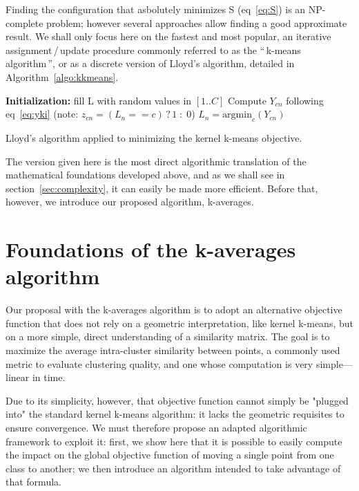 \documentclass[a4paper,twoside]{article}
\newcommand{\cad}{---} %
\newcommand{\gl}[1]{``\,#1\,''} %
\begin{document}
Finding the configuration that asbolutely minimizes S (eq~\ref{eq:S}) is an NP-complete problem; however several approaches allow finding a good approximate result. We shall only focus here on the fastest and most popular, an iterative assignment\,/\,update procedure commonly referred to as the \gl{k-means algorithm}, or as a discrete version of Lloyd's algorithm, detailed in Algorithm~\ref{algo:kkmeans}.

\begin{algorithm}
	\label{algo:kkmeans}
	\SetAlgoLined
	\BlankLine	
	\textbf{Initialization:} fill L with random values in $[1..C]$\;
	\BlankLine	
	 {
		 {
			 {
				Compute $Y_{cn}$ following eq~\ref{eq:yki} \label{algline:kkmeans_cplx1}
				(note: $z_{cn} = (L_n == c)\,?\,1\;:\;0$)
			}
			$L_n = \textrm{argmin}_c (Y_{cn})$\;
		}
	}
	\BlankLine
	\caption{Lloyd's algorithm applied to minimizing the kernel k-means objective.}
\end{algorithm}

The version given here is the most direct algorithmic translation of the mathematical foundations developed above, and as we shall see in section~\ref{sec:complexity}, it can easily be made more efficient. Before that, however, we introduce our proposed algorithm, k-averages.


\section{Foundations of the k-averages algorithm} \label{sec:kaverages}


Our proposal with the k-averages algorithm is to adopt an alternative objective function that does not rely on a geometric interpretation, like kernel k-means, but on a more simple, direct understanding of a similarity matrix. The goal is to maximize the average intra-cluster similarity between points, a commonly used metric to evaluate clustering quality, and one whose computation is very simple\cad{}linear in time.

Due to its simplicity, however, that objective function cannot simply be "plugged into" the standard kernel k-means algorithm: it lacks the geometric requisites to ensure convergence. We must therefore propose an adapted algorithmic framework to exploit it: first, we show here that it is possible to easily compute the impact on the global objective function of moving a single point from one class to another; we then introduce an algorithm intended to take advantage of that formula.
\end{document}
